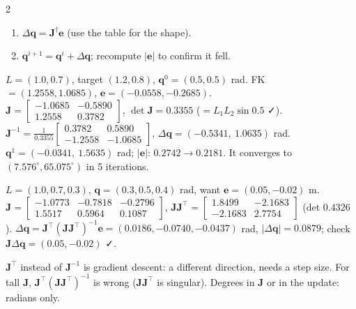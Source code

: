 \begin{multicols}{2}
\begin{recipe}
\begin{enumerate}
\item $\Delta\mathbf q=\mathbf J^\dagger\mathbf e$ (use the table for the shape).
\item $\mathbf q^{i+1}=\mathbf q^i+\Delta\mathbf q$; recompute $|\mathbf e|$ to confirm it fell.
\end{enumerate}
\end{recipe}
\begin{worked}
$L=(1.0,0.7)$, target $(1.2,0.8)$, $\mathbf q^0=(0.5,0.5)$ rad. FK $=(1.2558,1.0685)$, $\mathbf e=(-0.0558,-0.2685)$.\\
$\mathbf J=\begin{bmatrix}-1.0685&-0.5890\\1.2558&0.3782\end{bmatrix}$, $\det\mathbf J=0.3355$ ($=L_1L_2\sin0.5$ ✓).\\
$\mathbf J^{-1}=\frac1{0.3355}\begin{bmatrix}0.3782&0.5890\\-1.2558&-1.0685\end{bmatrix}$, $\Delta\mathbf q=(-0.5341,\ 1.0635)$ rad.\\
$\mathbf q^1=(-0.0341,\ 1.5635)$ rad; $|\mathbf e|$: $0.2742\to0.2181$. It converges to $(7.576^\circ,65.075^\circ)$ in 5 iterations. \chk
\end{worked}
\begin{worked}
$L=(1.0,0.7,0.3)$, $\mathbf q=(0.3,0.5,0.4)$ rad, want $\mathbf e=(0.05,-0.02)$ m. $\mathbf J=\begin{bmatrix}-1.0773&-0.7818&-0.2796\\1.5517&0.5964&0.1087\end{bmatrix}$, $\mathbf J\mathbf J^\top=\begin{bmatrix}1.8499&-2.1683\\-2.1683&2.7754\end{bmatrix}$ (det $0.4326$). $\Delta\mathbf q=\mathbf J^\top(\mathbf J\mathbf J^\top)^{-1}\mathbf e=(0.0186,-0.0740,-0.0437)$ rad, $|\Delta\mathbf q|=0.0879$; check $\mathbf J\Delta\mathbf q=(0.05,-0.02)$ ✓. \chk
\end{worked}
\begin{trap}
$\mathbf J^\top$ instead of $\mathbf J^{-1}$ is gradient descent: a different direction, needs a step size. For tall $\mathbf J$, $\mathbf J^\top(\mathbf J\mathbf J^\top)^{-1}$ is wrong ($\mathbf J\mathbf J^\top$ is singular). Degrees in $\mathbf J$ or in the update: radians only.
\end{trap}

\end{multicols}
